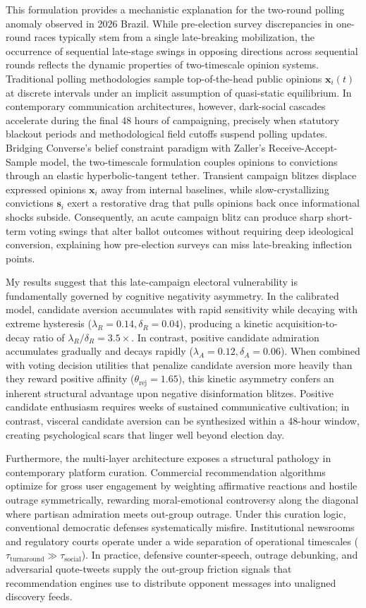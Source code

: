 \documentclass[11pt,a4paper]{article}
\begin{document}
This formulation provides a mechanistic explanation for the two-round polling anomaly observed in 2026 Brazil. While pre-election survey discrepancies in one-round races typically stem from a single late-breaking mobilization, the occurrence of sequential late-stage swings in opposing directions across sequential rounds reflects the dynamic properties of two-timescale opinion systems. Traditional polling methodologies sample top-of-the-head public opinions $\mathbf{x}_i(t)$ at discrete intervals under an implicit assumption of quasi-static equilibrium. In contemporary communication architectures, however, dark-social cascades accelerate during the final 48 hours of campaigning, precisely when statutory blackout periods and methodological field cutoffs suspend polling updates. Bridging Converse's belief constraint paradigm with Zaller's Receive-Accept-Sample model, the two-timescale formulation couples opinions to convictions through an elastic hyperbolic-tangent tether. Transient campaign blitzes displace expressed opinions $\mathbf{x}_i$ away from internal baselines, while slow-crystallizing convictions $\mathbf{s}_i$ exert a restorative drag that pulls opinions back once informational shocks subside. Consequently, an acute campaign blitz can produce sharp short-term voting swings that alter ballot outcomes without requiring deep ideological conversion, explaining how pre-election surveys can miss late-breaking inflection points.

My results suggest that this late-campaign electoral vulnerability is fundamentally governed by cognitive negativity asymmetry. In the calibrated model, candidate aversion accumulates with rapid sensitivity while decaying with extreme hysteresis ($\lambda_R = 0.14, \delta_R = 0.04$), producing a kinetic acquisition-to-decay ratio of $\lambda_R / \delta_R = 3.5\times$. In contrast, positive candidate admiration accumulates gradually and decays rapidly ($\lambda_A = 0.12, \delta_A = 0.06$). When combined with voting decision utilities that penalize candidate aversion more heavily than they reward positive affinity ($\theta_{\mathrm{rej}} = 1.65$), this kinetic asymmetry confers an inherent structural advantage upon negative disinformation blitzes. Positive candidate enthusiasm requires weeks of sustained communicative cultivation; in contrast, visceral candidate aversion can be synthesized within a 48-hour window, creating psychological scars that linger well beyond election day.

Furthermore, the multi-layer architecture exposes a structural pathology in contemporary platform curation. Commercial recommendation algorithms optimize for gross user engagement by weighting affirmative reactions and hostile outrage symmetrically, rewarding moral-emotional controversy along the diagonal where partisan admiration meets out-group outrage. Under this curation logic, conventional democratic defenses systematically misfire. Institutional newsrooms and regulatory courts operate under a wide separation of operational timescales ($\tau_{\mathrm{turnaround}} \gg \tau_{\mathrm{social}}$). In practice, defensive counter-speech, outrage debunking, and adversarial quote-tweets supply the out-group friction signals that recommendation engines use to distribute opponent messages into unaligned discovery feeds.
\end{document}
